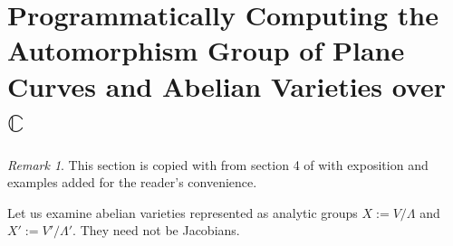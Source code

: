 \documentclass[12pt,reqno]{amsart}
\DeclareMathOperator{\Jac}{Jac}
\newcommand{\C}{\mathbb{C}}
\newcommand{\Z}{\mathbb{Z}}
\theoremstyle{definition}
\theoremstyle{remark}
\newtheorem*{remark}{Remark}
\begin{document}





\section{Programmatically Computing the Automorphism Group of Plane Curves and Abelian Varieties over $\mathbb{C}$}
\label{sec:chap4}
\begin{remark} This section is copied with from section 4 of \cite{jeroen} with exposition and examples added for the reader's convenience.\end{remark}

Let us examine abelian varieties represented as analytic groups $X := V/\Lambda$ and $X' := V'/\Lambda'$. They need not be Jacobians.

 

\end{document}
